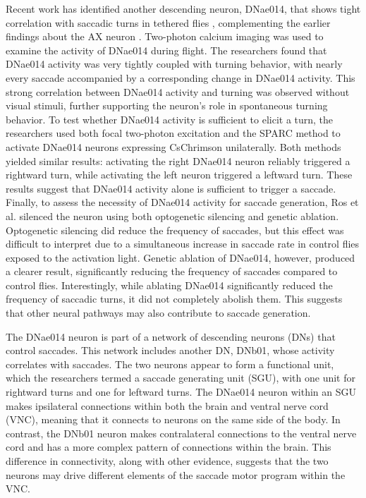 \documentclass[../main/thesis_msc.tex]{subfiles}
\begin{document}
	Recent work has identified another descending neuron, DNae014, that shows tight correlation with saccadic turns in tethered flies \autocite{ros_descending_2024}, complementing the earlier findings about the AX neuron \autocite{schnell_descending_2017}. Two-photon calcium imaging was used to examine the activity of DNae014 during flight. The researchers found that DNae014 activity was very tightly coupled with turning behavior, with nearly every saccade accompanied by a corresponding change in DNae014 activity. This strong correlation between DNae014 activity and turning was observed without visual stimuli, further supporting the neuron's role in spontaneous turning behavior. To test whether DNae014 activity is sufficient to elicit a turn, the researchers used both focal two-photon excitation and the SPARC method to activate DNae014 neurons expressing CsChrimson unilaterally. Both methods yielded similar results: activating the right DNae014 neuron reliably triggered a rightward turn, while activating the left neuron triggered a leftward turn. These results suggest that DNae014 activity alone is sufficient to trigger a saccade. Finally, to assess the necessity of DNae014 activity for saccade generation, Ros et al. silenced the neuron using both optogenetic silencing and genetic ablation. Optogenetic silencing did reduce the frequency of saccades, but this effect was difficult to interpret due to a simultaneous increase in saccade rate in control flies exposed to the activation light. Genetic ablation of DNae014, however, produced a clearer result, significantly reducing the frequency of saccades compared to control flies. Interestingly, while ablating DNae014 significantly reduced the frequency of saccadic turns, it did not completely abolish them. This suggests that other neural pathways may also contribute to saccade generation.

	The DNae014 neuron is part of a network of descending neurons (DNs) that control saccades. This network includes another DN, DNb01, whose activity correlates with saccades. The two neurons appear to form a functional unit, which the researchers termed a saccade generating unit (SGU), with one unit for rightward turns and one for leftward turns. The DNae014 neuron within an SGU makes ipsilateral connections within both the brain and ventral nerve cord (VNC), meaning that it connects to neurons on the same side of the body. In contrast, the DNb01 neuron makes contralateral connections to the ventral nerve cord and has a more complex pattern of connections within the brain. This difference in connectivity, along with other evidence, suggests that the two neurons may drive different elements of the saccade motor program within the VNC.
\end{document}
